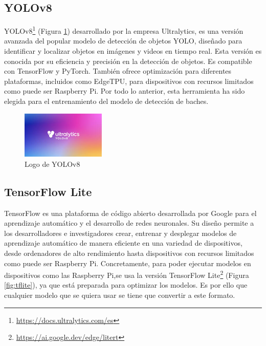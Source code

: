 \subsection{YOLOv8}

\acs{YOLO}v8\footnote{\url{https://docs.ultralytics.com/es}} (Figura \ref{fig:yolov8}) desarrollado por la empresa Ultralytics, es una versión avanzada del popular modelo de detección de objetos \ac{YOLO}, diseñado para identificar y localizar objetos en imágenes y videos en tiempo real. Esta versión es conocida por su eficiencia y precisión en la detección de objetos. Es compatible con TensorFlow y PyTorch. También ofrece optimización para diferentes plataformas, incluidos como EdgeTPU, para dispositivos con recursos limitados como puede ser Raspberry Pi. Por todo lo anterior, esta herramienta ha sido elegida para el entrenamiento del modelo de detección de baches. 

\begin{figure} [h!]
	\begin{center}
		\includegraphics[width=4cm]{figs/yolov8.png}
	\end{center}
	\caption{Logo de YOLOv8} %
	\label{fig:yolov8}
\end{figure}


\subsection{TensorFlow Lite}

TensorFlow es una plataforma de código abierto desarrollada por Google para el aprendizaje automático y el desarrollo de redes neuronales. Su diseño permite a los desarrolladores e investigadores crear, entrenar y desplegar modelos de aprendizaje automático de manera eficiente en una variedad de dispositivos, desde ordenadores de alto rendimiento hasta dispositivos con recursos limitados como puede ser Raspberry Pi. Concretamente, para poder ejecutar modelos en dispositivos como las Raspberry Pi,se usa la versión TensorFlow Lite\footnote{\url{https://ai.google.dev/edge/litert}} (Figura \ref{fig:tflite}), ya que está preparada para optimizar los modelos. Es por ello que cualquier modelo que se quiera usar se tiene que convertir a este formato. 

